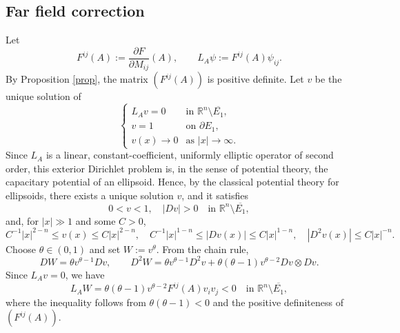 \documentclass[reqno,a4paper]{amsart}
\numberwithin{equation}{section}
\begin{document}
	\subsection*{Far field correction}
	
	Let
	\[
	F^{ij}(A) := \frac{\partial F}{\partial M_{ij}}(A), \qquad L_A \psi := F^{ij}(A) \psi_{ij}.
	\]
	By Proposition \ref{prop}, the matrix $(F^{ij}(A))$ is positive definite. Let $v$ be the unique solution of
	\[
	\begin{cases}
		L_A v = 0 & \text{in } \mathbb{R}^n \setminus \overline{E_1}, \\
		v = 1 & \text{on } \partial E_1, \\
		v(x) \to 0 & \text{as } |x| \to \infty.
	\end{cases}
	\]
	Since $L_A$ is a linear, constant-coefficient, uniformly elliptic operator of second order, this exterior Dirichlet problem is, in the sense of potential theory, the capacitary potential of an ellipsoid. Hence, by the classical potential theory for ellipsoids, there exists a unique solution $v$, and it satisfies
	\[
	0 < v < 1, \quad |Dv| > 0 \quad \text{in } \mathbb{R}^n \setminus \overline{E_1},
	\]
	and, for $|x| \gg 1$ and some $C > 0$,
	\[
	C^{-1}|x|^{2-n} \le v(x) \le C|x|^{2-n}, \quad
	C^{-1}|x|^{1-n} \le |Dv(x)| \le C|x|^{1-n}, \quad
	|D^2 v(x)| \le C|x|^{-n}. 
	\]
	Choose $\theta \in (0,1)$ and set $W := v^\theta$. From the chain rule,
	\begin{equation}
		DW = \theta v^{\theta-1} Dv, \qquad
		D^2 W = \theta v^{\theta-1} D^2 v + \theta(\theta-1) v^{\theta-2} Dv \otimes Dv. 
	\end{equation}
	Since $L_A v = 0$, we have
	\begin{equation}
		L_A W = \theta(\theta-1) v^{\theta-2} F^{ij}(A) v_i v_j < 0 \quad \text{in } \mathbb{R}^n \setminus \overline{E_1}, 
	\end{equation}
	where the inequality follows from $\theta(\theta-1)<0$ and the positive definiteness of $(F^{ij}(A))$.
	
\end{document}
